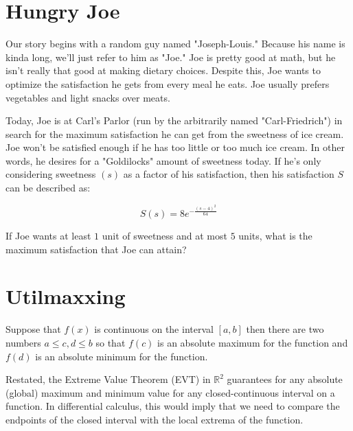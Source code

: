 \setcounter{chapter}{0}
\chapter{Hungry Joe}
Our story begins with a random guy named "Joseph-Louis."
Because his name is kinda long, we'll just refer to him as "Joe."
Joe is pretty good at math, but he isn't really that good at making dietary choices.
Despite this, Joe wants to optimize the satisfaction he gets from every meal he eats.
Joe usually prefers vegetables and light snacks over meats.

Today, Joe is at Carl's Parlor (run by the arbitrarily named "Carl-Friedrich") in search for the maximum satisfaction he can get from the sweetness of ice cream.
Joe won't be satisfied enough if he has too little or too much ice cream.
In other words, he desires for a "Goldilocks" amount of sweetness today.
If he's only considering sweetness $(s)$ as a factor of his satisfaction, then his satisfaction $S$ can be described as:\par
\LARGE
\begin{equation}
	S(s) = 8e^{-\frac{(s-4)^2}{64}}
\end{equation}
\normalsize
\begin{eg}
	If Joe wants at least $1$ unit of sweetness and at most $5$ units, what is the maximum satisfaction that Joe can attain?
\end{eg}
\setcounter{chapter}{1}
\chapter{Utilmaxxing}
\begin{theorem}
	Suppose that \(f\left( x \right)\) is continuous on the interval \(\left[ {a,b} \right]\) then there are two numbers \(a \le c,d \le b\) so that \(f\left( c \right)\) is an absolute maximum for the function and \(f\left( d \right)\) is an absolute minimum for the function.
\end{theorem}

Restated, the Extreme Value Theorem (EVT) in $\mathbb{R}^2$ guarantees for any absolute (global) maximum and minimum value for any closed-continuous interval on a function.
In differential calculus, this would imply that we need to compare the endpoints of the closed interval with the local extrema of the function.

